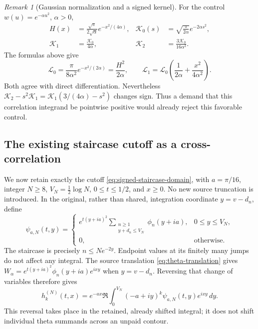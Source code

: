 \documentclass[11pt]{article}
\numberwithin{equation}{section}
\theoremstyle{definition}
\theoremstyle{remark}
\newtheorem{remark}[theorem]{Remark}
\newcommand{\dd}{\,d}
\newcommand{\Lag}{\mathcal L}
\begin{document}
\begin{remark}[Gaussian normalization and a signed kernel]
\label{rem:corr-gaussian}
For the control \(w(u)=e^{-\alpha u^2}\), \(\alpha>0\),
\begin{align*}
 H(x)&=\frac{\sqrt\pi}{2\sqrt\alpha}e^{-x^2/(4\alpha)},&
 \mathscr K_0(s)&=\sqrt{\frac{\pi}{2\alpha}}e^{-2\alpha s^2},\\
 \mathscr K_1&=\frac{\mathscr K_0}{4\alpha},&
 \mathscr K_2&=\frac{3\mathscr K_0}{16\alpha^2}.
\end{align*}
The formulas above give
\[
 \Lag_0=\frac{\pi}{8\alpha^2}e^{-x^2/(2\alpha)}
       =\frac{H^2}{2\alpha},\qquad
 \Lag_1=\Lag_0\left(\frac1{2\alpha}
                              +\frac{x^2}{4\alpha^2}\right).
\]
Both agree with direct differentiation.  Nevertheless
\(\mathscr K_2-s^2\mathscr K_1
 =\mathscr K_1(3/(4\alpha)-s^2)\) changes sign.
Thus a demand that this correlation integrand be pointwise positive
would already reject this favorable control.
\end{remark}

\subsection{The existing staircase cutoff as a cross-correlation}

We now retain exactly the cutoff
\eqref{eq:signed-staircase-domain}, with \(a=\pi/16\),
integer \(N\ge8\), \(V_N=\frac12\log N\),
\(0\le t\le1/2\), and \(x\ge0\).  No new source truncation is
introduced.  In the original, rather than shared, integration
coordinate \(y=v-d_n\), define
\begin{equation}
 \psi_{a,N}(t,y)=
 \begin{cases}
 e^{t(y+ia)^2}
   \displaystyle\sum_{\substack{n\ge1\\y+d_n\le V_N}}
                  \phi_n(y+ia),&0\le y\le V_N,\\
 0,&\text{otherwise}.
 \end{cases}
 \label{eq:corr-cutoff-source}
\end{equation}
The staircase is precisely \(n\le N e^{-2y}\).
Endpoint values at its finitely many jumps do not affect any integral.
The source translation \eqref{eq:theta-translation} gives
\(W_\alpha=e^{t(y+ia)^2}\phi_n(y+ia)e^{ixy}\)
when \(y=v-d_n\).  Reversing that change of variables therefore gives
\begin{equation}
 h_k^{(N)}(t,x)
  =e^{-ax}\Re\int_0^{V_N}
         (-a+iy)^k\psi_{a,N}(t,y)e^{ixy}\dd y.
 \label{eq:corr-cutoff-jet}
\end{equation}
This reversal takes place in the retained, already shifted integral;
it does not shift individual theta summands across an unpaid contour.
\end{document}
